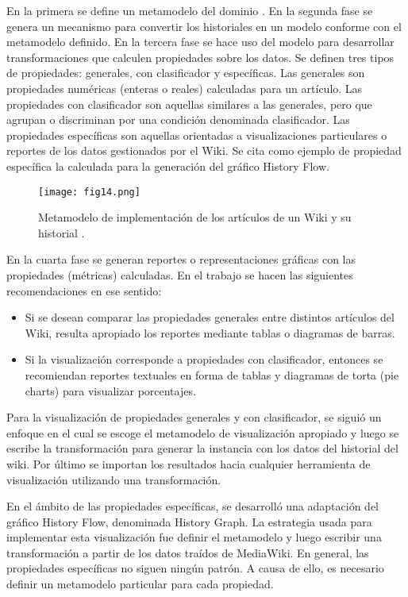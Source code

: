 En la primera se define un metamodelo del dominio . En la segunda fase se genera un mecanismo para convertir los historiales en un modelo conforme con el metamodelo definido. En la tercera fase se hace uso del modelo para desarrollar transformaciones que calculen propiedades sobre los datos. Se definen tres tipos de propiedades: generales, con clasificador y específicas. Las generales son propiedades numéricas (enteras o reales) calculadas para un artículo. Las propiedades con clasificador son aquellas similares a las generales, pero que agrupan o discriminan por una condición denominada clasificador. Las propiedades específicas son aquellas orientadas a visualizaciones particulares o reportes de los datos gestionados por el Wiki. Se cita como ejemplo de propiedad específica la calculada para la generación del gráfico History Flow.

\begin{figure}[htp]
  \centering
  \texttt{[image: fig14.png]}
  \caption[Metamodelo de implementación de los artículos de un Wiki y su historial]{Metamodelo de implementación de los artículos de un Wiki y su historial \cite[Fig. 2]{Sca08}.}
  \label{fig:fig14}
\end{figure}

En la cuarta fase se generan reportes o representaciones gráficas con las propiedades (métricas) calculadas. En el trabajo se hacen las siguientes recomendaciones en ese sentido:

\begin{itemize}
  \item Si se desean comparar las propiedades generales entre distintos artículos del Wiki, resulta apropiado los reportes mediante tablas o diagramas de barras.
  \item Si la visualización corresponde a propiedades con clasificador, entonces se recomiendan reportes textuales en forma de tablas y diagramas de torta (pie charts) para visualizar porcentajes.
\end{itemize}

Para la visualización de propiedades generales y con clasificador, se siguió un enfoque en el cual se escoge el metamodelo de visualización apropiado y luego se escribe la transformación para generar la instancia con los datos del historial del wiki. Por último se importan los resultados hacia cualquier herramienta de visualización utilizando una transformación.

En el ámbito de las propiedades específicas, se desarrolló una adaptación del gráfico History Flow, denominada History Graph. La estrategia usada para implementar esta visualización fue definir el metamodelo  y luego escribir una transformación a partir de los datos traídos de MediaWiki. En general, las propiedades específicas no siguen ningún patrón. A causa de ello, es necesario definir un metamodelo particular para cada propiedad.

